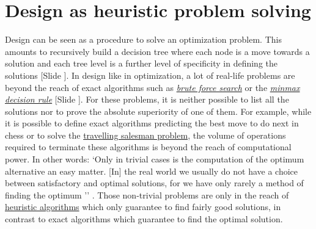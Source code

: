 \documentclass{article}
\newcounter{slide}
\begin{document}
\section{Design as heuristic problem solving}
\label{sec:GeneralProblemSolving}
Design can be seen as a procedure to solve an optimization problem. This amounts to recursively build a decision tree where each node is a move towards a solution and each tree level is a further level of specificity in defining the solutions {\color{blue}[Slide ]}. In design like in optimization, a lot of real-life problems are beyond the reach of exact algorithms such as \emph{\href{https://en.wikipedia.org/wiki/Brute-force_search}{brute force search}} or the \emph{\href{https://en.wikipedia.org/wiki/Minimax}{minmax decision rule}} {\color{blue}[Slide ]}. For these problems, it is neither possible to list all the solutions nor to prove the absolute superiority of one of them. For example, while it is possible to define exact algorithms predicting the best move to do next in chess or to solve the \href{https://en.wikipedia.org/wiki/Travelling_salesman_problem}{travelling salesman problem}, the volume of operations required to terminate these algorithms is beyond the reach of computational power. In other words: `Only in trivial cases is the computation of the optimum alternative an easy matter. [In] the real world we usually do not have a choice between satisfactory and optimal solutions, for we have only rarely a method of finding the optimum '' \cite[p. 118-120]{simon1996sciences}. Those non-trivial problems are only in the reach of \href{https://en.wikipedia.org/wiki/Heuristic_(computer_science)}{heuristic algorithms} which only guarantee to find fairly good solutions, in contrast to exact algorithms which guarantee to find the optimal solution. 
\end{document}
